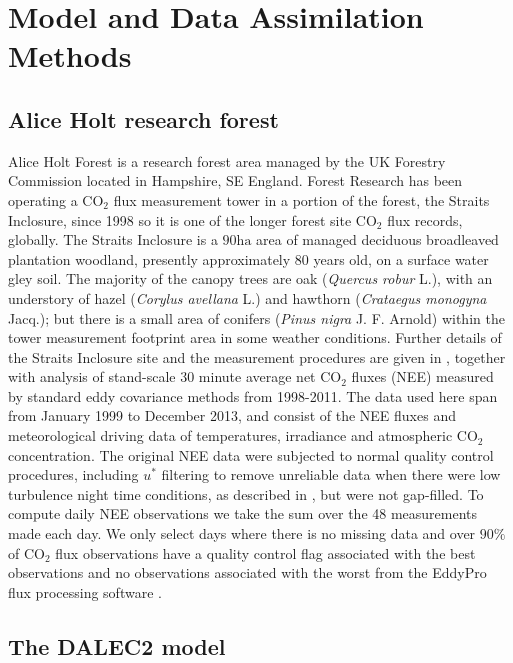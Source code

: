 \documentclass[review]{elsarticle}
\begin{document}
\section{Model and Data Assimilation Methods}

\subsection{Alice Holt research forest}

Alice Holt Forest is a research forest area managed by the UK Forestry Commission located in Hampshire, SE England. Forest Research has been operating a $\text{CO}_{2}$ flux measurement tower in a portion of the forest, the Straits Inclosure, since 1998 so it is one of the longer forest site $\text{CO}_2$ flux records, globally. The Straits Inclosure is a $90 \text{ha}$ area of managed deciduous broadleaved plantation woodland, presently approximately $80$ years old, on a surface water gley soil. The majority of the canopy trees are oak (\textit{Quercus robur} L.), with an understory of hazel (\textit{Corylus avellana} L.) and hawthorn (\textit{Crataegus monogyna} Jacq.); but there is a small area of conifers (\textit{Pinus nigra} J. F. Arnold) within the tower measurement footprint area in some weather conditions. Further details of the Straits Inclosure site and the measurement procedures are given in \citet{wilkinson2012inter}, together with analysis of stand-scale $30$ minute average net $\text{CO}_{2}$ fluxes (NEE) measured by standard eddy covariance methods from 1998-2011. The data used here span from January 1999 to December 2013, and consist of the NEE fluxes and meteorological driving data of temperatures, irradiance and atmospheric $\text{CO}_2$ concentration. The original NEE data were subjected to normal quality control procedures, including $u^{*}$ filtering to remove unreliable data when there were low turbulence night time conditions, as described in \citet{wilkinson2012inter}, but were not gap-filled. To compute daily NEE observations we take the sum over the 48 measurements made each day. We only select days where there is no missing data and over $90\% $ of $\text{CO}_2$ flux observations have a quality control flag associated with the best observations and no observations associated with the worst from the EddyPro flux processing software \citep{eddypro}.

\subsection{The DALEC2 model}
\end{document}
